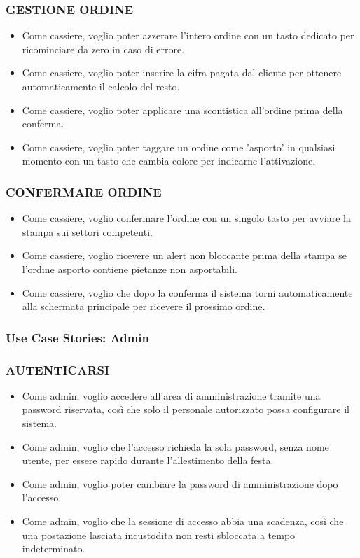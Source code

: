 \subsubsection*{GESTIONE ORDINE}
\begin{itemize}
    \item Come cassiere, voglio poter azzerare l'intero ordine con un tasto dedicato per ricominciare da zero in caso di errore.
    \item Come cassiere, voglio poter inserire la cifra pagata dal cliente per ottenere automaticamente il calcolo del resto.
    \item Come cassiere, voglio poter applicare una scontistica all'ordine prima della conferma.
    \item Come cassiere, voglio poter taggare un ordine come 'asporto' in qualsiasi momento con un tasto che cambia colore per indicarne l'attivazione.
\end{itemize}

\subsubsection*{CONFERMARE ORDINE}
\begin{itemize}
    \item Come cassiere, voglio confermare l'ordine con un singolo tasto per avviare la stampa sui settori competenti.
    \item Come cassiere, voglio ricevere un alert non bloccante prima della stampa se l'ordine asporto contiene pietanze non asportabili.
    \item Come cassiere, voglio che dopo la conferma il sistema torni automaticamente alla schermata principale per ricevere il prossimo ordine.
\end{itemize}

\subsubsection{Use Case Stories: Admin}

\subsubsection*{AUTENTICARSI}
\begin{itemize}
    \item Come admin, voglio accedere all'area di amministrazione tramite una password riservata, così che solo il personale autorizzato possa configurare il sistema.
    \item Come admin, voglio che l'accesso richieda la sola password, senza nome utente, per essere rapido durante l'allestimento della festa.
    \item Come admin, voglio poter cambiare la password di amministrazione dopo l'accesso.
    \item Come admin, voglio che la sessione di accesso abbia una scadenza, così che una postazione lasciata incustodita non resti sbloccata a tempo indeterminato.
\end{itemize}

